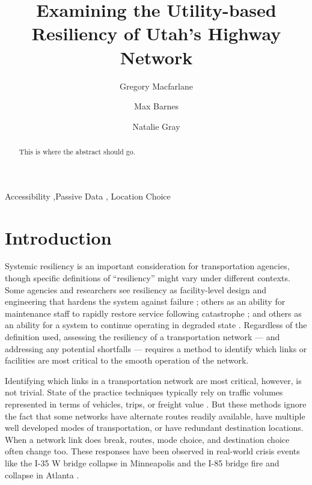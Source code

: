 \documentclass[3p, authoryear]{elsarticle} %
\begin{document}
\begin{frontmatter}

  \title{Examining the Utility-based Resiliency of Utah's Highway Network}
    \author[Brigham Young University]{Gregory Macfarlane%
  }
    \author[Brigham Young University]{Max Barnes%
  }
    \author[Brigham Young University]{Natalie Gray%
  }
  
  \begin{abstract}
  This is where the abstract should go.
  \end{abstract}
    \begin{keyword}
    Accessibility \sep Passive Data \sep 
    Location Choice
  \end{keyword}
  
 \end{frontmatter}

\hypertarget{intro}{%
\section{Introduction}\label{intro}}

Systemic resiliency is an important consideration for transportation agencies,
though specific definitions of ``resiliency'' might vary under different contexts.
Some agencies and researchers see resiliency as facility-level design and
engineering that hardens the system against failure \citep{bradley2007, peeta2010};
others as an ability for maintenance staff to rapidly restore service following
catastrophe \citep{zhang2016}; and others as an ability for a system to continue
operating in degraded state \citep{berdica2002, ip2011}. Regardless of the
definition used, assessing the resiliency of a transportation network --- and
addressing any potential shortfalls --- requires a method to identify which
links or facilities are most critical to the smooth operation of the network.

Identifying which links in a transportation network are most critical, however,
is not trivial. State of the practice techniques typically rely on traffic volumes
represented in terms of vehicles, trips, or freight value \citep{aem2017}. But these
methods ignore the fact that some networks have alternate routes readily available,
have multiple well developed modes of transportation, or have redundant
destination locations. When a network link does break, routes, mode choice, and
destination choice often change too. These responses have been observed in
real-world crisis events like the I-35 W bridge collapse in Minneapolis and the
I-85 bridge fire and collapse in Atlanta
\citep{zhu2010, levinson2010, xie2011, hamedi2018}.
\end{document}
